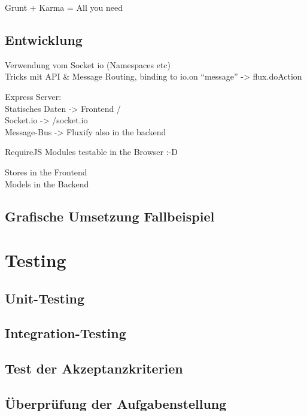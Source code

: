 \documentclass[oneside,11pt,parskip=half,ngerman]{scrreprt}
\begin{document}
Grunt + Karma = All you need

\section{Entwicklung}\label{entwicklung}

Verwendung vom Socket io (Namespaces etc)\\Tricks mit API \& Message
Routing, binding to io.on \enquote{message} -\textgreater{}
flux.doAction

Express Server:\\Statisches Daten -\textgreater{} Frontend /\\Socket.io
-\textgreater{} /socket.io\\Message-Bus -\textgreater{} Fluxify also in
the backend

RequireJS Modules testable in the Browser :-D

Stores in the Frontend\\Models in the Backend

\section{Grafische Umsetzung
Fallbeispiel}\label{grafische-umsetzung-fallbeispiel}

\chapter{Testing}\label{testing}

\section{Unit-Testing}\label{unit-testing}

\section{Integration-Testing}\label{integration-testing}

\section{Test der Akzeptanzkriterien}\label{test-der-akzeptanzkriterien}

\section{Überprüfung der
Aufgabenstellung}\label{uxfcberpruxfcfung-der-aufgabenstellung}
\end{document}
